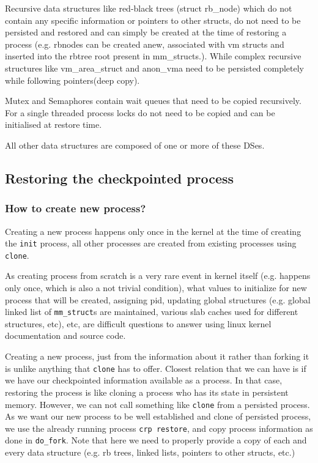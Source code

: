 \documentclass[a4paper,12pt]{article}
\begin{document}
Recursive data structures like red-black trees (struct rb\_node) which do not contain any specific information or pointers to other structs, do not need to be persisted and restored and can simply be created at the time of restoring a process (e.g. rbnodes can be created anew, associated with vm structs and inserted into the rbtree root present in mm\_structs.). While complex recursive structures like vm\_area\_struct and anon\_vma need to be persisted completely while following pointers(deep copy).  

Mutex and Semaphores contain wait queues that need to be copied recursively. For a single threaded process locks do not need to be copied and can be initialised at restore time. 
 
All other data structures are composed of one or more of these DSes.

\subsection{Restoring the checkpointed process}
\subsubsection{How to create new process?}
Creating a new process happens only once in the kernel at the time of creating the \verb|init| process, all other processes are created from existing processes using \verb|clone|.

As creating process from scratch is a very rare event in kernel itself (e.g. happens only once, which is also a not trivial condition), what values to initialize for new process that will be created, assigning pid, updating global structures (e.g. global linked list of \verb|mm_struct|s are maintained, various slab caches used for different structures, etc), etc, are difficult questions to answer using linux kernel documentation and source code.

Creating a new process, just from the information about it rather than forking it is unlike anything that \verb|clone| has to offer. Closest relation that we can have is if we have our checkpointed information available as a process. In that case, restoring the process is like cloning a process who has its state in persistent memory. However, we can not call something like \verb|clone| from a persisted process. As we want our new process to be well established and clone of persisted process, we use the already running process \verb|crp restore|, and copy process information as done in \verb|do_fork|. Note that here we need to properly provide a copy of each and every data structure (e.g. rb trees, linked lists, pointers to other structs, etc.)
\end{document}
